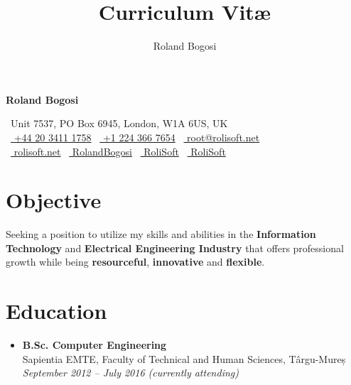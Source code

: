 \documentclass[11pt,a4paper]{article}
\author{Roland Bogosi}
\title{Curriculum Vit\ae}
\begin{document}
	\begin{center}
	{\Huge\textbf{\color{LightBlue} Roland Bogosi}{\color{Gray}\hspace{7pt}\textbar\hspace{4pt}{\scalebox{.9}[1.0]{Curriculum Vit\ae}}}}
	\vspace{15pt}
	
	{\color{DarkGray}
		\faHome\ Unit 7537, PO Box 6945, London, W1A 6US, UK\\
		
		\faPhone\ \href{tel:+442034111758}{\color{DarkGray} +44 20 3411 1758} \hspace{4pt}{\color{Gray}$\bullet$}\hspace{4pt}
		\faPhone\ \href{tel:+12243667654}{\color{DarkGray} +1 224 366 7654} \hspace{4pt}{\color{Gray}$\bullet$}\hspace{4pt}
		\faEnvelopeO\ \href{mailto:root@rolisoft.net}{\color{DarkGray} root@rolisoft.net}\\
		
		\faGlobe\ \href{https://rolisoft.net/}{\color{DarkGray} rolisoft.net} \hspace{3pt}{\color{Gray}$\bullet$}\hspace{4pt}
		\faLinkedin\ \href{https://www.linkedin.com/in/RolandBogosi}{\color{DarkGray} RolandBogosi} \hspace{3pt}{\color{Gray}$\bullet$}\hspace{4pt}
		\faSkype\ \href{skype:RoliSoft}{\color{DarkGray} RoliSoft} \hspace{3pt}{\color{Gray}$\bullet$}\hspace{4pt}
		\faGithub\ \href{https://github.com/RoliSoft}{\color{DarkGray} RoliSoft}
	}
	\end{center}

\section{Objective}
	Seeking a position to utilize my skills and abilities in the \textbf{Information Technology} and \textbf{Electrical Engineering Industry} that offers professional growth while being \textbf{resourceful}, \textbf{innovative} and \textbf{flexible}.

\section{Education}
	\begin{itemize}
	\item	{\large\textbf{B.Sc. Computer Engineering}}\\
			Sapientia EMTE, Faculty of Technical and Human Sciences, Târgu-Mureș\\
			\textit{September 2012 – July 2016 (currently attending)}
	\end{itemize}
\end{document}
